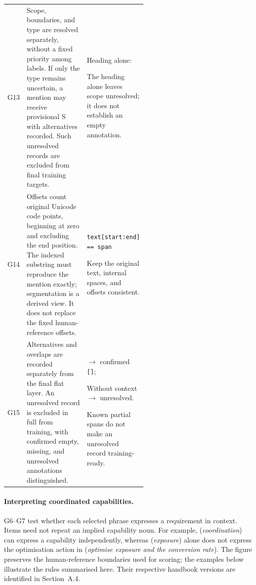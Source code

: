 \begin{longtable}{@{}P{0.07\linewidth}P{0.49\linewidth}P{\linewidth-16pt\relax}@{}}
G13 & Scope, boundaries, and type are resolved separately, without a fixed priority among labels. If only the type remains uncertain, a mention may receive provisional S with alternatives recorded. Such unresolved records are excluded from final training targets. & Heading alone: \par\smallskip The heading alone leaves scope unresolved; it does not establish an empty annotation. \\[5pt]
G14 & Offsets count original Unicode code points, beginning at zero and excluding the end position. The indexed substring must reproduce the mention exactly; segmentation is a derived view. It does not replace the fixed human-reference offsets. & \texttt{text[start:end] == span}\par\smallskip Keep the original text, internal spaces, and offsets consistent. \\[5pt]
G15 & Alternatives and overlaps are recorded separately from the final flat layer. An unresolved record is excluded in full from training, with confirmed empty, missing, and unresolved annotations distinguished. & \par $\rightarrow$ confirmed \texttt{[]};\par\smallskip{}\par Without context $\rightarrow$ unresolved.\par\smallskip Known partial spans do not make an unresolved record training-ready. \\
\bottomrule
\end{longtable}
\endgroup

\paragraph{Interpreting coordinated capabilities.}
G6--G7 test whether each selected phrase expresses a requirement in context. Items need not repeat an implied capability noun. For example,  (\emph{coordination}) can express a capability independently, whereas  (\emph{exposure}) alone does not express the optimisation action in  (\emph{optimise exposure and the conversion rate}). The figure preserves the human-reference boundaries used for scoring; the examples below illustrate the rules summarised here. Their respective handbook versions are identified in Section~A.4.

